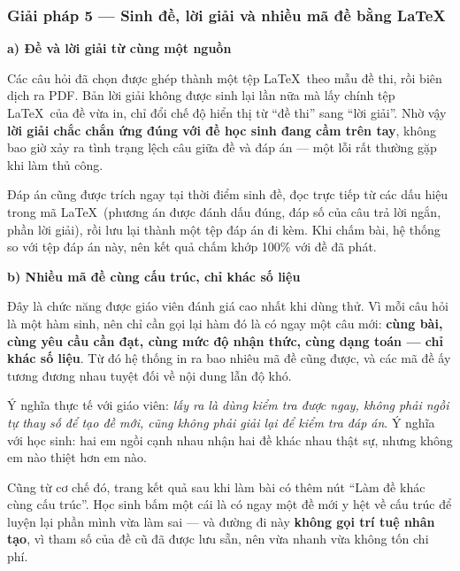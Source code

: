 \clearpage
\subsubsection{Giải pháp 5 --- Sinh đề, lời giải và nhiều mã đề bằng \LaTeX}

\textbf{a) Đề và lời giải từ cùng một nguồn}

Các câu hỏi đã chọn được ghép thành một tệp \LaTeX\ theo mẫu đề thi, rồi biên
dịch ra PDF. Bản lời giải không được sinh lại lần nữa mà lấy chính tệp
\LaTeX\ của đề vừa in, chỉ đổi chế độ hiển thị từ ``đề thi'' sang ``lời giải''.
Nhờ vậy \textbf{lời giải chắc chắn ứng đúng với đề học sinh đang cầm trên tay},
không bao giờ xảy ra tình trạng lệch câu giữa đề và đáp án --- một lỗi rất
thường gặp khi làm thủ công.

Đáp án cũng được trích ngay tại thời điểm sinh đề, đọc trực tiếp từ các dấu
hiệu trong mã \LaTeX\ (phương án được đánh dấu đúng, đáp số của câu trả lời
ngắn, phần lời giải), rồi lưu lại thành một tệp đáp án đi kèm. Khi chấm bài,
hệ thống so với tệp đáp án này, nên kết quả chấm khớp 100\% với đề đã phát.

\textbf{b) Nhiều mã đề cùng cấu trúc, chỉ khác số liệu}

Đây là chức năng được giáo viên đánh giá cao nhất khi dùng thử. Vì mỗi câu hỏi
là một hàm sinh, nên chỉ cần gọi lại hàm đó là có ngay một câu mới:
\textbf{cùng bài, cùng yêu cầu cần đạt, cùng mức độ nhận thức, cùng dạng toán
--- chỉ khác số liệu}. Từ đó hệ thống in ra bao nhiêu mã đề cũng được, và các
mã đề ấy tương đương nhau tuyệt đối về nội dung lẫn độ khó.

Ý nghĩa thực tế với giáo viên: \textit{lấy ra là dùng kiểm tra được ngay, không
phải ngồi tự thay số để tạo đề mới, cũng không phải giải lại để kiểm tra đáp
án}. Ý nghĩa với học sinh: hai em ngồi cạnh nhau nhận hai đề khác nhau thật
sự, nhưng không em nào thiệt hơn em nào.

Cũng từ cơ chế đó, trang kết quả sau khi làm bài có thêm nút ``Làm đề khác cùng
cấu trúc''. Học sinh bấm một cái là có ngay một đề mới y hệt về cấu trúc để
luyện lại phần mình vừa làm sai --- và đường đi này \textbf{không gọi trí tuệ
nhân tạo}, vì tham số của đề cũ đã được lưu sẵn, nên vừa nhanh vừa không tốn
chi phí.




